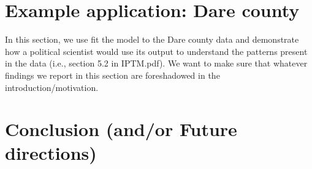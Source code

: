 \documentclass[twoside]{article}
\begin{document}
\section{Example application: Dare county}
In this section, we use fit the model to the Dare county data and demonstrate how a political scientist would use its output to understand the patterns present in the data (i.e., section 5.2 in IPTM.pdf).  We want to make sure that whatever findings we report in this section are foreshadowed in the introduction/motivation.

\section{Conclusion (and/or Future directions)}





\end{document}

